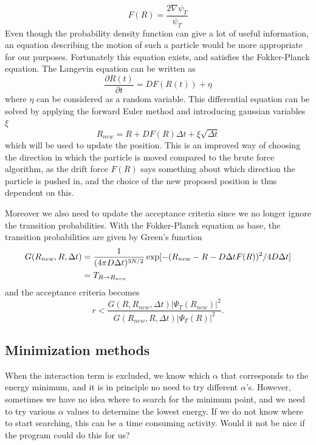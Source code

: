 \documentclass[norsk,a4paper,12pt]{article}
\begin{document}
\begin{equation}
	\label{eq:drift_force}
	F(R) = \frac{2 \nabla \psi_T}{\psi_T}
\end{equation}
Even though the probability density function can give a lot of useful information, an equation describing the motion of such a particle would be more appropriate for our purposes. Fortunately this equation exists, and satisfies the Fokker-Planck equation. The Langevin equation can be written as
\begin{equation}
\frac{\partial R(t)}{\partial t}=DF(R(t)) + \eta
\end{equation}
where $\eta$ can be considered as a random variable. This differential equation can be solved by applying the forward Euler method and introducing gaussian variables $\xi$
\begin{equation}
R_{new} = R + DF(R)\Delta t + \xi\sqrt{\Delta t}
\end{equation}
which will be used to update the position. This is an improved way of choosing the direction in which the particle is moved compared to the brute force algorithm, as the drift force $F(R)$ says something about which direction the particle is pushed in, and the choice of the new proposed position is thus dependent on this.

Moreover we also need to update the acceptance criteria since we no longer ignore the transition probabilities. With the Fokker-Planck equation as base, the transition probabilities are given by Green's function
\begin{align}
G(R_{new},R,\Delta t)&=\frac{1}{(4\pi D\Delta t)^{3N/2}}\exp[-(R_{new} - R - D\Delta tF(R))^2/4D\Delta t]\notag\\
&=T_{R\rightarrow R_{new}}
\end{align}
and the acceptance criteria becomes
\begin{equation}
r<\frac{G(R,R_{new},\Delta t)|\Psi_T(R_{new})|^2}{G(R_{new},R,\Delta t)|\Psi_T(R)|^2}.
\end{equation}



\subsection{Minimization methods}
When the interaction term is excluded, we know which $\alpha$ that corresponds to the energy minimum, and it is in principle no need to try different $\alpha$'s. However, sometimes we have no idea where to search for the minimum point, and we need to try various $\alpha$ values to determine the lowest energy. If we do not know where to start searching, this can be a time consuming activity. Would it not be nice if the program could do this for us?
\end{document}
